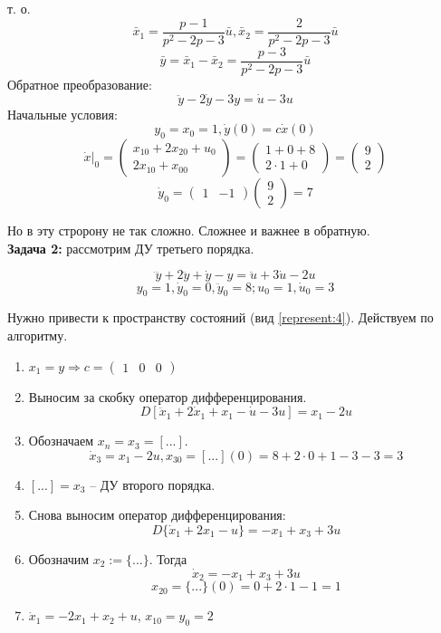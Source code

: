 \documentclass[main.tex]{subfiles}
\begin{document}
т. о.
\[ \bar x_1 = \frac{p-1}{p^2 - 2p - 3} \bar u, \bar x_2 = \frac{2}{p^2 - 2p - 3} \bar u \]
\[ \bar y = \bar x_1 - \bar x_2 = \frac{p-3}{p^2 - 2p - 3} \bar u \]
Обратное преобразование:
\[ \boxed{ \ddot y - 2 \dot y - 3y = \dot u - 3 u } \]
Начальные условия:
\[ y_0 = x_0 = 1, \dot y(0) = c \dot x(0) \]
\[ \dot x|_0 = \begin{pmatrix}
    x_{10} + 2 x_{20} + u_0 \\
    2 x_{10} + x_{00}
\end{pmatrix} = \begin{pmatrix}
1 + 0 + 8 \\
2 \cdot 1 + 0
\end{pmatrix} = \begin{pmatrix}
9 \\ 2
\end{pmatrix} \]
\[ \dot y_0 = \begin{pmatrix}
    1 & -1
\end{pmatrix} \begin{pmatrix}
9 \\ 2
\end{pmatrix} = 7 \]

Но в эту стророну не так сложно.
Сложнее и важнее в обратную. \\

\textbf{ Задача 2: } рассмотрим ДУ третьего порядка.

\[ \dddot{y} + 2 \ddot y + \dot y - y = \ddot u + 3 \dot u - 2 u \]
\[ y_0 = 1, \dot y_0 = 0, \ddot y_0 = 8; u_0 = 1, \dot u_0 = 3 \]

Нужно привести к пространству состояний (вид \ref{represent:4}).
Действуем по алгоритму.

\begin{enumerate}[noitemsep]
    \item $ x_1 = y \Rightarrow c = \begin{pmatrix}
        1 & 0 & 0
    \end{pmatrix} $
    \item Выносим за скобку оператор дифференцирования.
    \[ D[ \ddot x_1 + 2 \dot x_1 + x_1 - \dot u - 3 u ] = x_1 - 2 u \]
    \item Обозначаем $ x_n = x_3 = [...] $.
    \[ \dot x_3 = x_1 - 2 u, x_{30} = [...](0) = 8 + 2 \cdot 0 + 1 - 3 - 3 = 3 \]
    \item $ [...] = x_3 $ -- ДУ второго порядка.
    \item Снова выносим оператор дифференцирования:
    \[ D\{ \dot x_1 + 2 x_1 - u \} = - x_1 + x_3 + 3 u \]
    \item Обозначим $ x_2 := \{...\} $.
    Тогда
    \[ \dot x_2 = -x_1 + x_3 + 3 u \]
    \[ x_{20} = \{ ... \}(0) = 0 + 2 \cdot 1 - 1 = 1 \]
    \item $ \dot x_1 = - 2 x_1 + x_2 + u $, $x_{10} = y_0 = 2 $
\end{enumerate}
\end{document}
